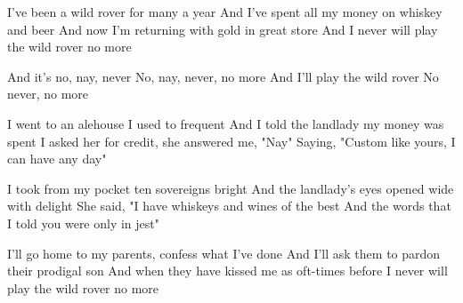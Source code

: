 \begin{verse*}
I've been a wild rover for many a year
And I've spent all my money on whiskey and beer
And now I'm returning with gold in great store
And I never will play the wild rover no more
\end{verse*}

\begin{chorus}
And it's no, nay, never
No, nay, never, no more
And I'll play the wild rover
No never, no more
\end{chorus}

\begin{verse*}
I went to an alehouse I used to frequent
And I told the landlady my money was spent
I asked her for credit, she answered me, "Nay"
Saying, "Custom like yours, I can have any day"
\end{verse*}

\thechorus

\begin{verse*}
I took from my pocket ten sovereigns bright
And the landlady's eyes opened wide with delight
She said, "I have whiskeys and wines of the best
And the words that I told you were only in jest"
\end{verse*}

\thechorus

\begin{verse*}
I'll go home to my parents, confess what I've done
And I'll ask them to pardon their prodigal son
And when they have kissed me as oft-times before
I never will play the wild rover no more
\end{verse*}

\thechorus
